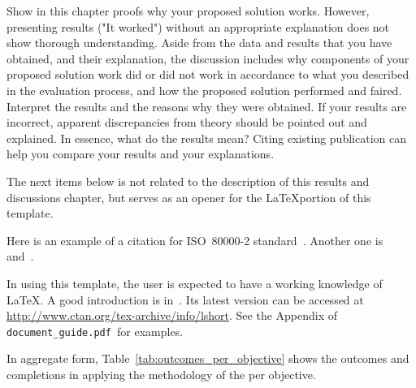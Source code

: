 
Show in this chapter proofs why your proposed solution works.  However, presenting results ("It worked") without an appropriate explanation does not show thorough understanding.  Aside from the data and results that you have obtained, and their explanation, the discussion includes why components of your proposed solution work did or did not work in accordance to what you described in the evaluation process, and how the proposed solution performed and faired. Interpret the results and the reasons why they were obtained.  If your results are incorrect, apparent discrepancies from theory should be pointed out and explained. In essence, what do the results mean?  Citing existing publication can help you compare your results and your explanations. 

The next items below is not related to the description of this results and discussions chapter, but serves as an opener for the \LaTeX portion of this template.

Here is an example of a citation for ISO~80000-2 standard~\cite{ISO800002}. Another one is~\cite{Einstein} and~\cite{croft-78}. 

In using this template, the user is expected to have a working knowledge of \LaTeX. A good introduction is in~\cite{Oetiker2014}.  Its latest version can be accessed at \url{http://www.ctan.org/tex-archive/info/lshort}. See the Appendix of \verb|document_guide.pdf |for examples.


In aggregate form, Table~\ref{tab:outcomes_per_objective} shows the outcomes and completions in applying the methodology of the \documentType per objective. 


